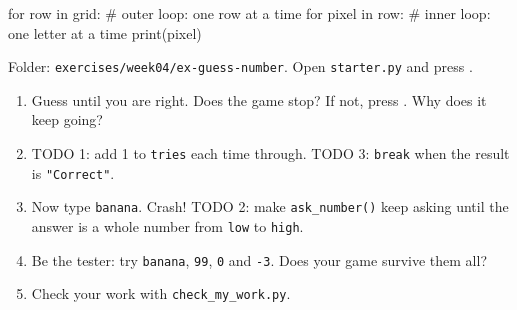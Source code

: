 \begin{center}
\end{center}
\begin{pycode}
for row in grid:            # outer loop: one row at a time
    for pixel in row:       # inner loop: one letter at a time
        print(pixel)
\end{pycode}

\begin{exercise}
Folder: \texttt{exercises/week04/ex-guess-number}. Open \texttt{starter.py} and press .
\begin{enumerate}[leftmargin=1.4em]
  \item Guess until you are right. Does the game stop? If not, press . Why does it keep going?
  \item TODO 1: add 1 to \texttt{tries} each time through. TODO 3: \texttt{break} when the result is \texttt{"Correct"}.
  \item Now type \texttt{banana}. Crash! TODO 2: make \texttt{ask\_number()} keep asking until the answer is a whole number from \texttt{low} to \texttt{high}.
  \item Be the tester: try \texttt{banana}, \texttt{99}, \texttt{0} and \texttt{-3}. Does your game survive them all? \tickbox
  \item Check your work with \texttt{check\_my\_work.py}.
\end{enumerate}
\end{exercise}

